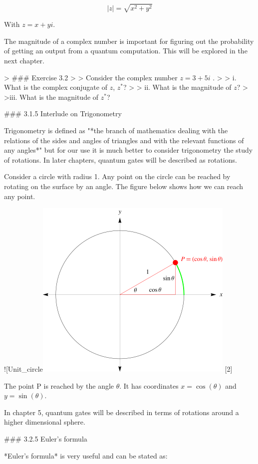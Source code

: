 \documentclass{book}
\begin{document}
 $$|z| = \sqrt{x^2 + y^2}$$

 With $z = x + yi$. 

 The magnitude of a complex number is important for figuring out the probability of getting an output from a quantum computation. This will be explored in the next chapter.

> ### Exercise 3.2 
>
> Consider the complex number $z = 3 + 5i$ . 
>
> i. What is the complex conjugate of $z$, $z^*$?
> 
> ii. What is the magnitude of $z$?
>
>iii. What is the magnitude of $z^*$?

### 3.1.5 Interlude on Trigonometry 

Trigonometry is defined as "*the branch of mathematics dealing with the relations of the sides and angles of triangles and with the relevant functions of any angles*" but for our use it is much better to consider trigonometry the study of rotations. In later chapters, quantum gates will be described as rotations. 

Consider a circle with radius 1. Any point on the circle can be reached by rotating on the surface by an angle. The figure below shows how we can reach any point.

![Unit_circle\includegraphics{images/TrigonometryUnitCircle_700.png}
[2]

The point P is reached by the angle $\theta$. It has coordinates $x = \cos(\theta)$ and $ y = \sin(\theta)$.

In chapter 5, quantum gates will be described in terms of rotations around a higher dimensional sphere. 

### 3.2.5 Euler's formula

*Euler's formula* is very useful and can be stated as:
\end{document}

